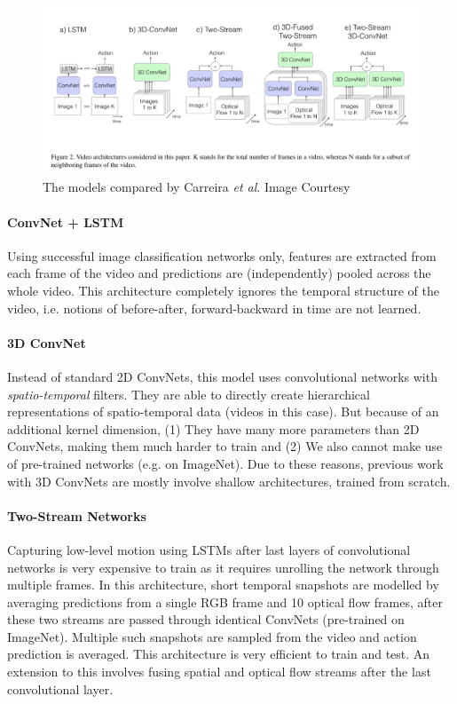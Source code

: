 \begin{figure}

\includegraphics[width=\linewidth]{assets/img/carreira2018quo-models.png}
\caption{The models compared by Carreira \textit{et al}. Image Courtesy \cite{carreira2018quo}}
\label{fig:carreira2018quo-models}

\end{figure}

\paragraph{ConvNet + LSTM}
Using successful image classification networks only, features are extracted from each frame 
of the video and predictions are (independently) pooled across the whole video. This 
architecture completely ignores the temporal structure of the video, i.e. notions of 
before-after, forward-backward in time are not learned.

\paragraph{3D ConvNet}
Instead of standard 2D ConvNets, this model uses convolutional networks with 
\textit{spatio-temporal} filters. They are able to directly create hierarchical 
representations of spatio-temporal data (videos in this case). But because of an additional 
kernel dimension, (1) They have many more parameters than 2D ConvNets, making them much 
harder to train and (2) We also cannot make use of pre-trained networks (e.g. on ImageNet). 
Due to these reasons, previous work with 3D ConvNets are mostly involve shallow 
architectures, trained from scratch.

\paragraph{Two-Stream Networks}
Capturing low-level motion using LSTMs after last layers of convolutional networks is very 
expensive to train as it requires unrolling the network through multiple frames. In this 
architecture, short temporal snapshots are modelled by averaging predictions from a single 
RGB frame and 10 optical flow frames, after these two streams are passed through identical 
ConvNets (pre-trained on ImageNet). Multiple such snapshots are sampled from the video and 
action prediction is averaged. This architecture is very efficient to train and test. An 
extension to this involves fusing spatial and optical flow streams after the last 
convolutional layer.

